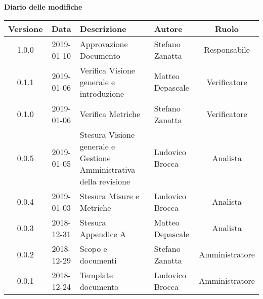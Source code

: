 	\begin{center}
		\textbf{Diario delle modifiche}
	\end{center}
	\begin{center}
		\begin{tabularx}{\textwidth}{|c|c|X|X|c|}
			\hline
			\textbf{Versione} & \textbf{Data} & \textbf{Descrizione} & \textbf{Autore} & \textbf{Ruolo} \\
			\hline
			1.0.0 & 2019-01-10 & Approvazione Documento& Stefano Zanatta & Responsabile\\
			\hline
			0.1.1 & 2019-01-06 & Verifica Visione generale e introduzione & Matteo Depascale & Verificatore\\
			\hline
			0.1.0 & 2019-01-06 & Verifica Metriche & Stefano Zanatta & Verificatore\\
			\hline
			0.0.5 & 2019-01-05 & Stesura Visione generale e Gestione Amministrativa della revisione  & Ludovico Brocca& Analista\\
			\hline	
			0.0.4 & 2019-01-03& Stesura Misure e Metriche &Ludovico Brocca & Analista\\
			\hline
			0.0.3 & 2018-12-31 & Stesura Appendice A & Matteo Depascale & Analista\\
			\hline
			0.0.2 & 2018-12-29 & Scopo e documenti & Stefano Zanatta & Amministratore\\
			\hline
			0.0.1 & 2018-12-24 & Template documento & Ludovico Brocca & Amministratore\\
			\hline
		\end{tabularx}
	\end{center}
\newpage
